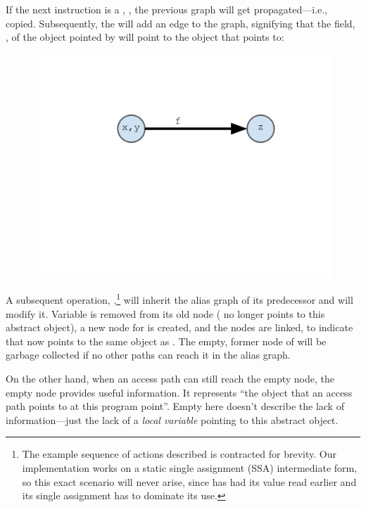 If the next instruction is a , , the previous graph will get propagated---i.e., copied. Subsequently, the  will add an edge to the graph, signifying that the field, , of the object pointed by  will point to the object that  points to:

\begin{figure}[h]
\centering
\includegraphics[trim={35mm 115mm 35mm 51mm},clip,width=0.8\linewidth]{assets/must-data/alias-graph2.pdf}
\end{figure}

A subsequent  operation, ,\footnote{The example sequence of actions described is contracted for brevity. Our implementation works on a static single assignment (SSA) intermediate form, so this exact scenario will never arise, since  has had its value read earlier and its single assignment has to dominate its use.} will inherit the alias graph of its predecessor and will modify it. Variable  is removed from its old node ( no longer points to this abstract object), a new node for  is created, and the nodes are linked, to indicate that  now points to the same object as . The empty, former node of  will be garbage collected if no other paths can reach it in the alias graph.

On the other hand, when an access path can still reach the empty node, the empty node provides useful information. It represents ``the object that an access path points to at this program point''. Empty here doesn't describe the lack of information---just the lack of a \emph{local variable} pointing to this abstract object.

